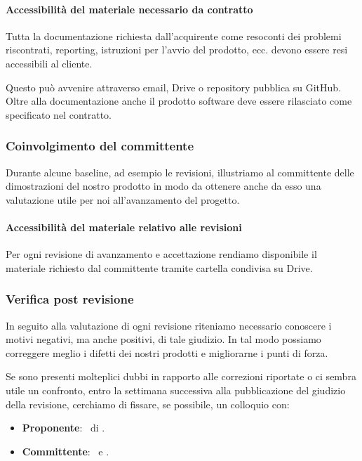 		\paragraph{Accessibilità del materiale necessario da contratto} \label{AccessibilitaMateriale}
		Tutta la documentazione richiesta dall'acquirente come resoconti dei problemi riscontrati,  reporting, istruzioni per l'avvio del prodotto, ecc. devono essere resi accessibili al cliente. \par
		Questo può avvenire attraverso email, Drive o repository pubblica su GitHub.
		Oltre alla documentazione anche il prodotto software deve essere rilasciato come specificato nel contratto.

		\subsubsection{Coinvolgimento del committente} \label{CoinvolgimentoCommittente}
		Durante alcune baseline, ad esempio le revisioni,
		illustriamo al committente delle dimostrazioni del nostro prodotto in modo da ottenere anche da esso una valutazione utile per noi all'avanzamento del progetto.

		\paragraph{Accessibilità del materiale relativo alle revisioni} \label{AccessibilitaMaterialeRevisioni}
		Per ogni revisione di avanzamento e accettazione rendiamo disponibile il materiale richiesto dal committente tramite cartella condivisa su Drive.

		\subsubsection{Verifica post revisione} \label{verificapostrevisione}
        In seguito alla valutazione di ogni revisione riteniamo necessario conoscere i motivi negativi, ma anche positivi, di tale giudizio. In tal modo possiamo correggere meglio i difetti dei nostri prodotti e migliorarne i punti di forza. \par
        Se sono presenti molteplici dubbi in rapporto alle correzioni riportate o ci sembra utile un confronto, entro la settimana successiva alla pubblicazione del giudizio della revisione, cerchiamo di fissare, se possibile, un colloquio con:
        \begin{itemize}
            \item \textbf{Proponente}: \DZ\ di \II.
            \item \textbf{Committente}: \TV\ e \RC.
		\end{itemize}


